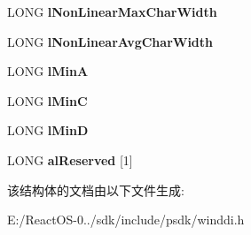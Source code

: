 \begin{DoxyCompactItemize}
\mbox{\label{struct___f_d___d_e_v_i_c_e_m_e_t_r_i_c_s_ac720d4a5b418b77cda9ba3f251563f9e}} 
L\+O\+NG {\bfseries l\+Non\+Linear\+Max\+Char\+Width}
\item 
\mbox{\label{struct___f_d___d_e_v_i_c_e_m_e_t_r_i_c_s_ad0a0071b58a892a207c2833d03934fc1}} 
L\+O\+NG {\bfseries l\+Non\+Linear\+Avg\+Char\+Width}
\item 
\mbox{\label{struct___f_d___d_e_v_i_c_e_m_e_t_r_i_c_s_adf1467160e05150d6c4075204024851a}} 
L\+O\+NG {\bfseries l\+MinA}
\item 
\mbox{\label{struct___f_d___d_e_v_i_c_e_m_e_t_r_i_c_s_a9a209768378408b7d41c7bcac4df80a7}} 
L\+O\+NG {\bfseries l\+MinC}
\item 
\mbox{\label{struct___f_d___d_e_v_i_c_e_m_e_t_r_i_c_s_a846c120ff4fe9e919674687ba8bacf77}} 
L\+O\+NG {\bfseries l\+MinD}
\item 
\mbox{\label{struct___f_d___d_e_v_i_c_e_m_e_t_r_i_c_s_ab8ccedbad74211a6db32e8dc9d2e9a78}} 
L\+O\+NG {\bfseries al\+Reserved} \mbox{[}1\mbox{]}
\end{DoxyCompactItemize}


该结构体的文档由以下文件生成\+:\begin{DoxyCompactItemize}
\item 
E\+:/\+React\+O\+S-\/0../sdk/include/psdk/winddi.\+h\end{DoxyCompactItemize}

